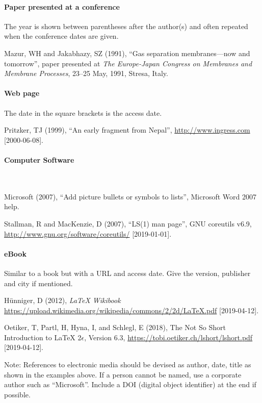 \documentclass[a5paper, 10pt]{article}
\begin{document}
\paragraph{Paper presented at a conference}
The year is shown between parentheses after the author(s) and often repeated when the conference dates are given.

Mazur, WH and Jakabhazy, SZ (1991), ``Gas separation 
  membranes---now 
  and tomorrow'', paper presented at \textit{The Europe-Japan
  Congress on Membranes and Membrane Processes}, 23--25 May, 1991,
  Stresa, Italy.

\paragraph{Web page}
The date in the square brackets is the access date.

Pritzker, TJ (1999), ``An early fragment from Nepal'',
  \url{http://www.ingress.com} [2000-06-08].  

\paragraph{Computer Software}
\label{page:ref_compsoftware}
~

Microsoft (2007), ``Add picture bullets or symbols to lists'',
  Microsoft Word 2007 help.

Stallman, R and MacKenzie, D (2007), ``LS(1) man page'', GNU
  coreutils v6.9, \url{http://www.gnu.org/software/coreutils/} [2019-01-01].
  
\paragraph{eBook}
Similar to a book but with a URL and access date. Give the version, publisher and city if mentioned. 

H\"unniger, D (2012), \textit{LaTeX Wikibook} 
  \url{https://upload.wikimedia.org/wikipedia/commons/2/2d/LaTeX.pdf} [2019-04-12].
 
Oetiker, T, Partl, H, Hyna, I, and Schlegl, E (2018), The Not So 
 Short Introduction to LaTeX 2$\epsilon$, Version 6.3,  \url{https://tobi.oetiker.ch/lshort/lshort.pdf} [2019-04-12].



Note: References to electronic media should be devised as author,
date, title as shown in the examples above. If a person cannot be 
named, use a corporate author such as ``Microsoft''. Include a DOI (digital object identifier) at the end if possible.
\end{document}
